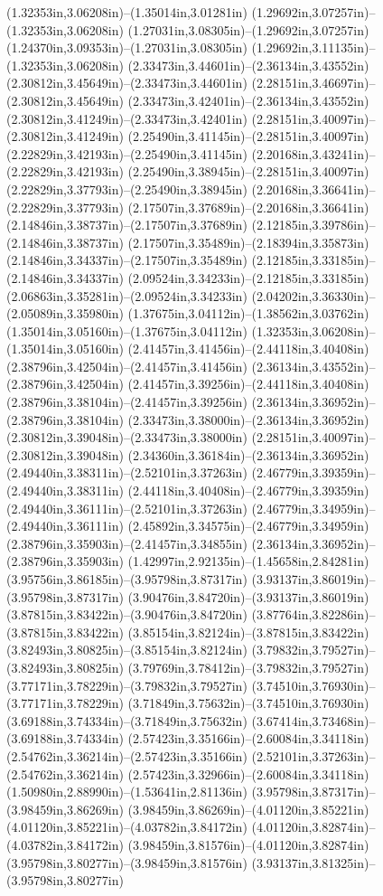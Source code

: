 (1.32353in,3.06208in)--(1.35014in,3.01281in) (1.29692in,3.07257in)--(1.32353in,3.06208in) (1.27031in,3.08305in)--(1.29692in,3.07257in) (1.24370in,3.09353in)--(1.27031in,3.08305in) (1.29692in,3.11135in)--(1.32353in,3.06208in) (2.33473in,3.44601in)--(2.36134in,3.43552in) (2.30812in,3.45649in)--(2.33473in,3.44601in) (2.28151in,3.46697in)--(2.30812in,3.45649in) (2.33473in,3.42401in)--(2.36134in,3.43552in) (2.30812in,3.41249in)--(2.33473in,3.42401in) (2.28151in,3.40097in)--(2.30812in,3.41249in) (2.25490in,3.41145in)--(2.28151in,3.40097in) (2.22829in,3.42193in)--(2.25490in,3.41145in) (2.20168in,3.43241in)--(2.22829in,3.42193in) (2.25490in,3.38945in)--(2.28151in,3.40097in) (2.22829in,3.37793in)--(2.25490in,3.38945in) (2.20168in,3.36641in)--(2.22829in,3.37793in) (2.17507in,3.37689in)--(2.20168in,3.36641in) (2.14846in,3.38737in)--(2.17507in,3.37689in) (2.12185in,3.39786in)--(2.14846in,3.38737in) (2.17507in,3.35489in)--(2.18394in,3.35873in) (2.14846in,3.34337in)--(2.17507in,3.35489in) (2.12185in,3.33185in)--(2.14846in,3.34337in) (2.09524in,3.34233in)--(2.12185in,3.33185in) (2.06863in,3.35281in)--(2.09524in,3.34233in) (2.04202in,3.36330in)--(2.05089in,3.35980in) (1.37675in,3.04112in)--(1.38562in,3.03762in) (1.35014in,3.05160in)--(1.37675in,3.04112in) (1.32353in,3.06208in)--(1.35014in,3.05160in) (2.41457in,3.41456in)--(2.44118in,3.40408in) (2.38796in,3.42504in)--(2.41457in,3.41456in) (2.36134in,3.43552in)--(2.38796in,3.42504in) (2.41457in,3.39256in)--(2.44118in,3.40408in) (2.38796in,3.38104in)--(2.41457in,3.39256in) (2.36134in,3.36952in)--(2.38796in,3.38104in) (2.33473in,3.38000in)--(2.36134in,3.36952in) (2.30812in,3.39048in)--(2.33473in,3.38000in) (2.28151in,3.40097in)--(2.30812in,3.39048in) (2.34360in,3.36184in)--(2.36134in,3.36952in) (2.49440in,3.38311in)--(2.52101in,3.37263in) (2.46779in,3.39359in)--(2.49440in,3.38311in) (2.44118in,3.40408in)--(2.46779in,3.39359in) (2.49440in,3.36111in)--(2.52101in,3.37263in) (2.46779in,3.34959in)--(2.49440in,3.36111in) (2.45892in,3.34575in)--(2.46779in,3.34959in) (2.38796in,3.35903in)--(2.41457in,3.34855in) (2.36134in,3.36952in)--(2.38796in,3.35903in) (1.42997in,2.92135in)--(1.45658in,2.84281in) (3.95756in,3.86185in)--(3.95798in,3.87317in) (3.93137in,3.86019in)--(3.95798in,3.87317in) (3.90476in,3.84720in)--(3.93137in,3.86019in) (3.87815in,3.83422in)--(3.90476in,3.84720in) (3.87764in,3.82286in)--(3.87815in,3.83422in) (3.85154in,3.82124in)--(3.87815in,3.83422in) (3.82493in,3.80825in)--(3.85154in,3.82124in) (3.79832in,3.79527in)--(3.82493in,3.80825in) (3.79769in,3.78412in)--(3.79832in,3.79527in) (3.77171in,3.78229in)--(3.79832in,3.79527in) (3.74510in,3.76930in)--(3.77171in,3.78229in) (3.71849in,3.75632in)--(3.74510in,3.76930in) (3.69188in,3.74334in)--(3.71849in,3.75632in) (3.67414in,3.73468in)--(3.69188in,3.74334in) (2.57423in,3.35166in)--(2.60084in,3.34118in) (2.54762in,3.36214in)--(2.57423in,3.35166in) (2.52101in,3.37263in)--(2.54762in,3.36214in) (2.57423in,3.32966in)--(2.60084in,3.34118in) (1.50980in,2.88990in)--(1.53641in,2.81136in) (3.95798in,3.87317in)--(3.98459in,3.86269in) (3.98459in,3.86269in)--(4.01120in,3.85221in) (4.01120in,3.85221in)--(4.03782in,3.84172in) (4.01120in,3.82874in)--(4.03782in,3.84172in) (3.98459in,3.81576in)--(4.01120in,3.82874in) (3.95798in,3.80277in)--(3.98459in,3.81576in) (3.93137in,3.81325in)--(3.95798in,3.80277in) 